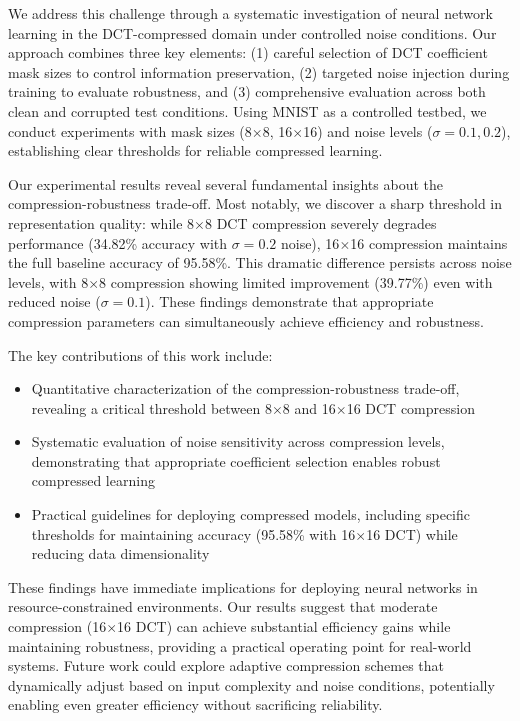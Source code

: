 \documentclass{article} %
\begin{document}
We address this challenge through a systematic investigation of neural network learning in the DCT-compressed domain under controlled noise conditions. Our approach combines three key elements: (1) careful selection of DCT coefficient mask sizes to control information preservation, (2) targeted noise injection during training to evaluate robustness, and (3) comprehensive evaluation across both clean and corrupted test conditions. Using MNIST as a controlled testbed, we conduct experiments with mask sizes (8$\times$8, 16$\times$16) and noise levels ($\sigma = 0.1, 0.2$), establishing clear thresholds for reliable compressed learning.

Our experimental results reveal several fundamental insights about the compression-robustness trade-off. Most notably, we discover a sharp threshold in representation quality: while 8$\times$8 DCT compression severely degrades performance (34.82\% accuracy with $\sigma=0.2$ noise), 16$\times$16 compression maintains the full baseline accuracy of 95.58\%. This dramatic difference persists across noise levels, with 8$\times$8 compression showing limited improvement (39.77\%) even with reduced noise ($\sigma=0.1$). These findings demonstrate that appropriate compression parameters can simultaneously achieve efficiency and robustness.

The key contributions of this work include:
\begin{itemize}
    \item Quantitative characterization of the compression-robustness trade-off, revealing a critical threshold between 8$\times$8 and 16$\times$16 DCT compression
    \item Systematic evaluation of noise sensitivity across compression levels, demonstrating that appropriate coefficient selection enables robust compressed learning
    \item Practical guidelines for deploying compressed models, including specific thresholds for maintaining accuracy (95.58\% with 16$\times$16 DCT) while reducing data dimensionality
\end{itemize}

These findings have immediate implications for deploying neural networks in resource-constrained environments. Our results suggest that moderate compression (16$\times$16 DCT) can achieve substantial efficiency gains while maintaining robustness, providing a practical operating point for real-world systems. Future work could explore adaptive compression schemes that dynamically adjust based on input complexity and noise conditions, potentially enabling even greater efficiency without sacrificing reliability.
\end{document}
